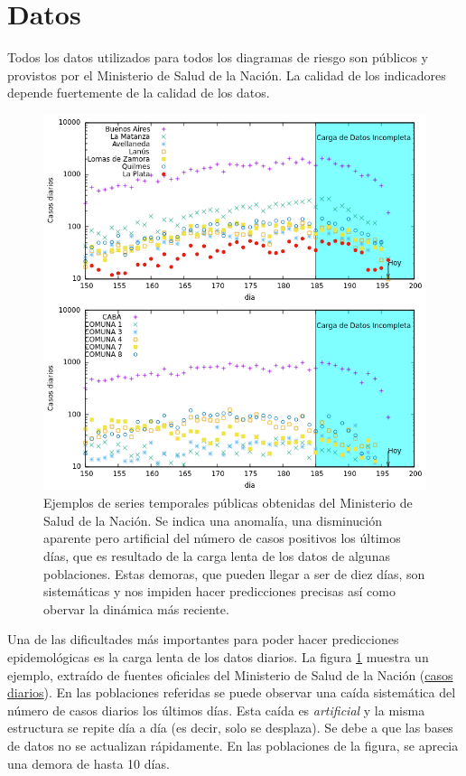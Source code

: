 \documentclass[12pt,a4paper]{article}
\begin{document}
\section*{Datos}
Todos los datos utilizados para todos los diagramas de riesgo 
son públicos y provistos por el Ministerio de Salud de la Nación.
La calidad de los indicadores depende fuertemente de la calidad de los datos.
\begin{figure}
\begin{center}
\includegraphics[width=14cm,clip=true]{datosdemorados2.png}
\end{center}
\caption{
Ejemplos de series temporales públicas 
obtenidas del Ministerio de Salud de la Nación. 
Se indica una anomalía, una disminución aparente pero artificial 
del número de casos positivos los últimos días, 
que es resultado de la carga lenta de los datos de 
algunas poblaciones. Estas demoras, que pueden llegar a ser de diez días, 
son sistemáticas y nos impiden hacer predicciones precisas así como obervar la 
dinámica más reciente. 
}
\label{fig:lento}
\end{figure}



Una de las dificultades más importantes para poder hacer predicciones epidemológicas es la carga lenta de los datos diarios. La figura \ref{fig:lento} muestra un ejemplo, extraído de fuentes oficiales del Ministerio de Salud de la Nación (\hyperref[https://sisa.msal.gov.ar/datos/descargas/covid-19/]{casos diarios}). En las poblaciones referidas se puede observar una caída sistemática del número de casos diarios los últimos días. Esta caída es \textit{artificial} y la misma estructura se repite día a día (es decir, solo se desplaza). Se debe a que las bases de datos no se actualizan rápidamente. En las poblaciones de la figura, se aprecia una demora de hasta 10 días.
\end{document}
